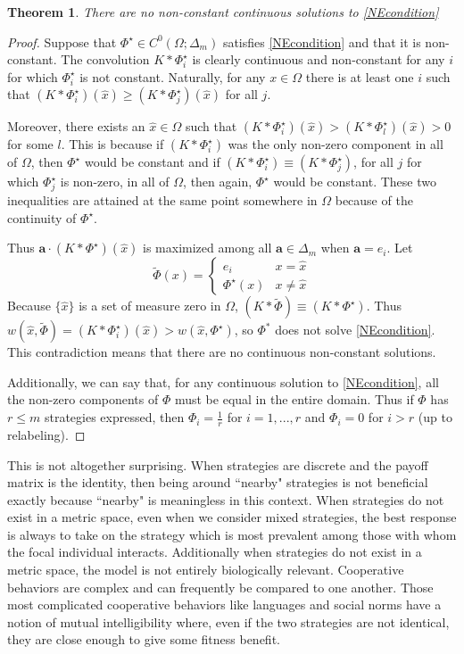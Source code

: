 \documentclass[]{article}
\newtheorem{theorem}{Theorem}
\begin{document}
		\begin{theorem} {There are no non-constant continuous solutions to \eqref{NEcondition}}
			\end{theorem} 
		\begin{proof} 
			Suppose that $\Phi^\star\in C^0(\Omega;\Delta_m)$ satisfies \eqref{NEcondition} and that it is non-constant. The convolution $K*\Phi^\star_i$ is clearly continuous and  non-constant for any $i$ for which $\Phi^\star_i$ is not constant. Naturally, for any $x\in \Omega$ there is at least one $i$  such that $(K*\Phi^\star_i)(\hat x)\geq (K* \Phi^\star_j)(\hat x)$ for all $j$. 
			
			Moreover, there exists an $\hat x\in \Omega$ such that $(K*\Phi^\star_i)(\hat x)>(K*\Phi^\star_l)(\hat x)>0$ for some $l$. This is because if $(K*\Phi^\star_i)$ was the only non-zero component in all of $\Omega$, then $\Phi^\star$ would be constant and if $(K*\Phi^\star_i)\equiv (K*\Phi^\star_j)$, for all $j$ for which $\Phi^\star_j$ is non-zero, in all of $\Omega$, then again, $\Phi^\star$ would be constant. These two inequalities are attained at the same point somewhere in $\Omega$ because of the continuity of $\Phi^\star$. 
		
			 Thus $\mathbf{a}\cdot (K*\Phi^\star)(\hat x)$ is maximized among all $\mathbf{a}\in \Delta_m$ when $\mathbf{a}=e_i$. Let  \begin{equation}\tilde{\Phi}(x)=\begin{cases} e_i&x=\hat x\\
					\Phi^\star(x)&x\neq \hat x \end{cases}
			\end{equation}
			Because $\{\hat x\}$ is a set of measure zero in $\Omega$, $(K*\tilde{\Phi})\equiv(K*\Phi^\star)$. Thus $w(\hat x, \tilde{\Phi})=(K*\Phi_i^\star)(\hat x)>w(\hat x, \Phi^\star)$, so $\Phi^*$ does not solve \eqref{NEcondition}. This contradiction means that there are no continuous non-constant solutions. 
			
			Additionally, we can say that, for any continuous solution to \eqref{NEcondition}, all the non-zero components of $\Phi$ must be equal in the entire domain. Thus if $\Phi$ has $r\leq m$ strategies expressed, then $\Phi_i=\frac{1}{r}$ for $i=1,...,r$ and $\Phi_i=0$ for $i>r$ (up to relabeling). 
		\end{proof}
	
		This is not altogether surprising. When strategies are discrete and the payoff matrix is the identity, then being around ``nearby" strategies is not beneficial exactly because ``nearby" is meaningless in this context. When strategies do not exist in a metric space, even when we consider mixed strategies, the best response is always to take on the strategy which is most prevalent among those with whom the focal individual interacts. Additionally when strategies do not exist in a metric space, the model is not entirely biologically relevant. Cooperative behaviors are complex and can frequently be compared to one another. Those most complicated cooperative behaviors like languages and social norms have a notion of mutual intelligibility where, even if the two strategies are not identical, they are close enough to give some fitness benefit. 
\end{document}

